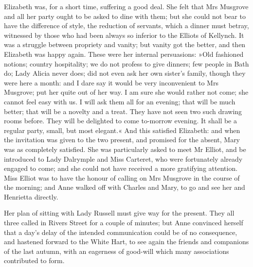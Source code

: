 Elizabeth was, for a short time, suffering a good deal. She felt that Mrs Musgrove and all her party ought to be asked to dine with them; but she could not bear to have the difference of style, the reduction of servants, which a dinner must betray, witnessed by those who had been always so inferior to the Elliots of Kellynch. It was a struggle between propriety and vanity; but vanity got the better, and then Elizabeth was happy again. These were her internal persuasions: »Old fashioned notions; country hospitality; we do not profess to give dinners; few people in Bath do; Lady Alicia never does; did not even ask her own sister's family, though they were here a month: and I dare say it would be very inconvenient to Mrs Musgrove; put her quite out of her way. I am sure she would rather not come; she cannot feel easy with us. I will ask them all for an evening; that will be much better; that will be a novelty and a treat. They have not seen two such drawing rooms before. They will be delighted to come to-morrow evening. It shall be a regular party, small, but most elegant.« And this satisfied Elizabeth: and when the invitation was given to the two present, and promised for the absent, Mary was as completely satisfied. She was particularly asked to meet Mr Elliot, and be introduced to Lady Dalrymple and Miss Carteret, who were fortunately already engaged to come; and she could not have received a more gratifying attention. Miss Elliot was to have the honour of calling on Mrs Musgrove in the course of the morning; and Anne walked off with Charles and Mary, to go and see her and Henrietta directly.

Her plan of sitting with Lady Russell must give way for the present. They all three called in Rivers Street for a couple of minutes; but Anne convinced herself that a day's delay of the intended communication could be of no consequence, and hastened forward to the White Hart, to see again the friends and companions of the last autumn, with an eagerness of good-will which many associations contributed to form.

